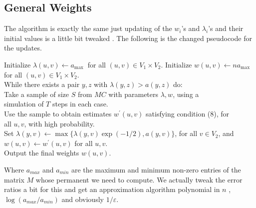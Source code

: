 \subsection{General Weights}
\begin{flushleft}
	The algorithm is exactly the same just updating of the $w_i$'s and $\lambda_i$'s and their initial values is a little bit tweaked . The following is the changed pseudocode for the updates.
\end{flushleft}
\begin{flushleft}
	Initialize $\lambda(u, v) \leftarrow a_{\text {max }}$ for all $(u, v) \in V_1 \times V_2$.
	Initialize $w(u, v) \leftarrow n a_{\max }$ for all $(u, v) \in V_1 \times V_2$.\\
	While there exists a pair $y, z$ with $\lambda(y, z)>a(y, z)$ do:\\
	\parinn Take a sample of size $S$ from $M C$ with parameters $\lambda, w$, using a \\simulation of $T$ steps in each case.\\
	Use the sample to obtain estimates $w^{\prime}(u, v)$ satisfying condition (8), for \\all $u, v$, with high probability.\\
	Set $\lambda(y, v) \leftarrow \max \{\lambda(y, v) \exp (-1 / 2), a(y, v)\}$, for all $v \in V_2$, and \\$w(u, v) \leftarrow w^{\prime}(u, v)$ for all $u, v$.\\
	\parinf
	Output the final weights $w(u, v)$.
\end{flushleft}
Where $a_{max}$ and $a_{min}$ are the maximum and minimum non-zero entries of the matrix $M$ whose permanent we need to compute. We actually tweak  the error ratios a bit for this and get an approximation algorithm polynomial in $n$ , $\log{(a_{max}/a_{min})}$ and obviously $1/\varepsilon$.
